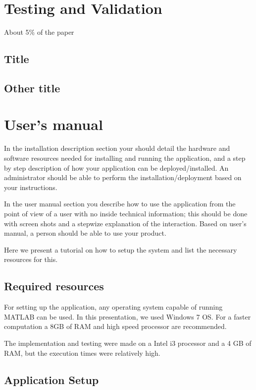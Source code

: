 \documentclass[12pt,a4paper,twoside]{report}
\begin{document}
{\chapter{Testing and Validation}

About 5\% of the paper
\section{Title}
\section{Other title}
\chapter{User's manual}
In the installation description section your should detail the hardware and software resources needed for installing and running the application, and a step by step description of how your application can be deployed/installed. An administrator should be able to perform the installation/deployment based on your instructions.

In the user manual section you describe how to use the application from the point of view of a user with no inside technical information; this should be done with screen shots and a stepwize explanation of the interaction. Based on user's manual, a person should be able to use your product.

Here we present a tutorial on how to setup the system and list the necessary resources for this.

\section{Required resources}
For setting up the application, any operating system capable of running MATLAB can be used. In this presentation, we used Windows 7 OS. For a faster computation a 8GB of RAM and high speed processor are recommended. 

The implementation and testing were made on a Intel i3 processor and a 4 GB of RAM, but the execution times were relatively high.



\section{Application Setup}
\begin{enumerate}
	\item Copy the contents of the CD to  and extract the archive.
	\item Start MATLAB.
	\item Set MATLAB working directory to 
\end{document}
